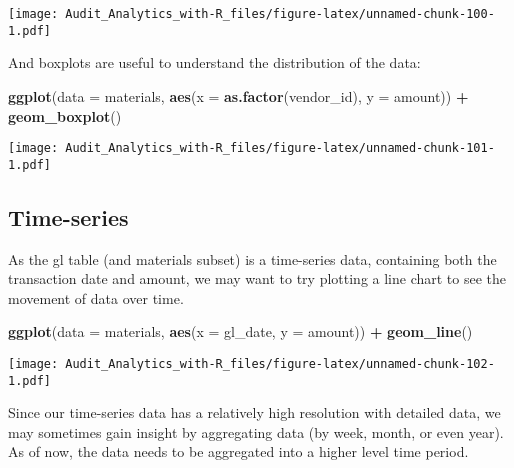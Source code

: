 \documentclass[
]{book}
\newenvironment{Shaded}{\begin{snugshade}}{\end{snugshade}}
\newcommand{\CommentTok}[1]{\textcolor[rgb]{0.56,0.35,0.01}{\textit{#1}}}
\newcommand{\DataTypeTok}[1]{\textcolor[rgb]{0.13,0.29,0.53}{#1}}
\newcommand{\KeywordTok}[1]{\textcolor[rgb]{0.13,0.29,0.53}{\textbf{#1}}}
\newcommand{\NormalTok}[1]{#1}
\newcommand{\OperatorTok}[1]{\textcolor[rgb]{0.81,0.36,0.00}{\textbf{#1}}}
\newcommand{\StringTok}[1]{\textcolor[rgb]{0.31,0.60,0.02}{#1}}
\begin{document}
\texttt{[image: Audit\_Analytics\_with-R\_files/figure-latex/unnamed-chunk-100-1.pdf]}

And boxplots are useful to understand the distribution of the data:

\begin{Shaded}
\begin{Highlighting}[]
\KeywordTok{ggplot}\NormalTok{(}\DataTypeTok{data =}\NormalTok{ materials, }\KeywordTok{aes}\NormalTok{(}\DataTypeTok{x =} \KeywordTok{as.factor}\NormalTok{(vendor_id), }\DataTypeTok{y =}\NormalTok{ amount)) }\OperatorTok{+}
\StringTok{  }\KeywordTok{geom_boxplot}\NormalTok{()}
\end{Highlighting}
\end{Shaded}

\texttt{[image: Audit\_Analytics\_with-R\_files/figure-latex/unnamed-chunk-101-1.pdf]}

\hypertarget{time-series}{%
\subsection{Time-series}\label{time-series}}

As the gl table (and materials subset) is a time-series data, containing both the transaction date and amount, we may want to try plotting a line chart to see the movement of data over time.

\begin{Shaded}
\begin{Highlighting}[]
\KeywordTok{ggplot}\NormalTok{(}\DataTypeTok{data =}\NormalTok{ materials, }\KeywordTok{aes}\NormalTok{(}\DataTypeTok{x =}\NormalTok{ gl_date, }\DataTypeTok{y =}\NormalTok{ amount)) }\OperatorTok{+}
\StringTok{  }\KeywordTok{geom_line}\NormalTok{()}
\end{Highlighting}
\end{Shaded}

\texttt{[image: Audit\_Analytics\_with-R\_files/figure-latex/unnamed-chunk-102-1.pdf]}

Since our time-series data has a relatively high resolution with detailed data, we may sometimes gain insight by aggregating data (by week, month, or even year). As of now, the data needs to be aggregated into a higher level time period.

\begin{Shaded}
\end{Shaded}
\end{document}
